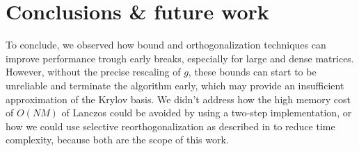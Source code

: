 \documentclass[11pt]{article}
\theoremstyle{definition}
\theoremstyle{remark}
\theoremstyle{experimental}
\begin{document}
\section{Conclusions \& future work}

To conclude, we observed how bound and orthogonalization techniques can improve performance
trough early breaks, especially for large and dense matrices. However, without the precise
rescaling of $ g $, these bounds can start to be
unreliable and terminate the algorithm early, which may provide an insufficient approximation of the Krylov basis.
We didn't address how the high memory cost of $ O(N M) $ of Lanczos could be avoided by
using a two-step implementation, or how we could use selective reorthogonalization as described in
\cite{demmel1997} to reduce time complexity, because both are the scope of this work.

\clearpage


\nocite{*}
\end{document}
